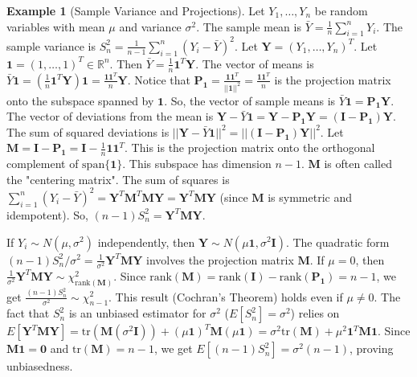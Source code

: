 \documentclass[12pt, letterpaper]{article}
\theoremstyle{definition}
\newtheorem{example}{Example}[section]
\newcommand{\R}{\mathbb{R}}
\newcommand{\mat}[1]{\mathbf{#1}} %
\newcommand{\vect}[1]{\mathbf{#1}} %
\newcommand{\rank}{\text{rank}}
\newcommand{\tr}{\text{tr}}
\newcommand{\Span}{\text{span}}
\begin{document}
\begin{example}[Sample Variance and Projections]
Let $Y_1, \dots, Y_n$ be random variables with mean $\mu$ and variance $\sigma^2$. The sample mean is $\bar{Y} = \frac{1}{n}\sum_{i=1}^n Y_i$. The sample variance is $S_n^2 = \frac{1}{n-1}\sum_{i=1}^n (Y_i - \bar{Y})^2$.
Let $\vect{Y} = (Y_1, \dots, Y_n)^T$. Let $\vect{1} = (1, \dots, 1)^T \in \R^n$.
Then $\bar{Y} = \frac{1}{n} \vect{1}^T \vect{Y}$.
The vector of means is $\bar{Y}\vect{1} = (\frac{1}{n} \vect{1}^T \vect{Y}) \vect{1} = \frac{\vect{1}\vect{1}^T}{n} \vect{Y}$.
Notice that $\mat{P}_{\vect{1}} = \frac{\vect{1}\vect{1}^T}{||\vect{1}||^2} = \frac{\vect{1}\vect{1}^T}{n}$ is the projection matrix onto the subspace spanned by $\vect{1}$.
So, the vector of sample means is $\bar{Y}\vect{1} = \mat{P}_{\vect{1}} \vect{Y}$.
The vector of deviations from the mean is $\vect{Y} - \bar{Y}\vect{1} = \vect{Y} - \mat{P}_{\vect{1}} \vect{Y} = (\mat{I} - \mat{P}_{\vect{1}}) \vect{Y}$.
The sum of squared deviations is $||\vect{Y} - \bar{Y}\vect{1}||^2 = ||(\mat{I} - \mat{P}_{\vect{1}}) \vect{Y}||^2$.
Let $\mat{M} = \mat{I} - \mat{P}_{\vect{1}} = \mat{I} - \frac{1}{n}\vect{1}\vect{1}^T$. This is the projection matrix onto the orthogonal complement of $\Span\{\vect{1}\}$. This subspace has dimension $n-1$. $\mat{M}$ is often called the "centering matrix".
The sum of squares is $\sum_{i=1}^n (Y_i - \bar{Y})^2 = \vect{Y}^T \mat{M}^T \mat{M} \vect{Y} = \vect{Y}^T \mat{M} \vect{Y}$ (since $\mat{M}$ is symmetric and idempotent).
So, $(n-1)S_n^2 = \vect{Y}^T \mat{M} \vect{Y}$.

If $Y_i \sim N(\mu, \sigma^2)$ independently, then $\vect{Y} \sim N(\mu\vect{1}, \sigma^2 \mat{I})$.
The quadratic form $(n-1)S_n^2/\sigma^2 = \frac{1}{\sigma^2}\vect{Y}^T \mat{M} \vect{Y}$ involves the projection matrix $\mat{M}$.
If $\mu=0$, then $\frac{1}{\sigma^2}\vect{Y}^T \mat{M} \vect{Y} \sim \chi^2_{\rank(\mat{M})}$. Since $\rank(\mat{M}) = \rank(\mat{I}) - \rank(\mat{P}_{\vect{1}}) = n - 1$, we get $\frac{(n-1)S_n^2}{\sigma^2} \sim \chi^2_{n-1}$. This result (Cochran's Theorem) holds even if $\mu \ne 0$.
The fact that $S_n^2$ is an unbiased estimator for $\sigma^2$ ($E[S_n^2] = \sigma^2$) relies on $E[\vect{Y}^T \mat{M} \vect{Y}] = \tr(\mat{M}(\sigma^2\mat{I})) + (\mu\vect{1})^T \mat{M} (\mu\vect{1}) = \sigma^2 \tr(\mat{M}) + \mu^2 \vect{1}^T \mat{M} \vect{1}$. Since $\mat{M}\vect{1} = \vect{0}$ and $\tr(\mat{M}) = n-1$, we get $E[(n-1)S_n^2] = \sigma^2(n-1)$, proving unbiasedness.
\end{example}
\end{document}
